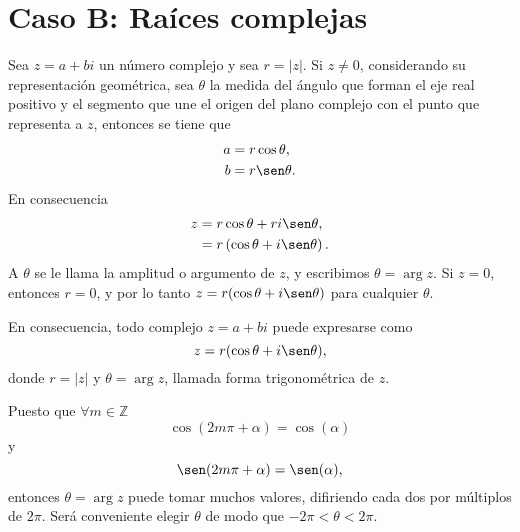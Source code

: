 \section*{Caso B: Raíces complejas}

Sea $z=a+bi$ un número complejo y sea $r=|z|$. Si $z \neq 0$, considerando su representación geométrica, sea $\theta$ la medida del ángulo que forman el eje real positivo y el segmento que une el origen del plano complejo con el punto que representa a $z$, entonces se tiene que
\begin{align*}
    a &=r \cos \theta , \\ 
    b &=r \sen \theta .
\end{align*}
En consecuencia
\begin{align*}
    z & = r \cos \theta + r i \sen \theta , \\ 
    &=r \left( \cos \theta + i \sen \theta \right) .
\end{align*}
A $\theta$ se le llama la amplitud o argumento de $z$, y escribimos $\theta=\arg z$. Si $z=0$, entonces $r=0$, y por lo tanto $z=r(\cos \theta+i \sen \theta)$ para cualquier $\theta$.

En consecuencia, todo complejo $z=a+b i$ puede expresarse como
$$z=r(\cos \theta+i \sen \theta),$$
donde $r=|z|$ y $\theta=\arg z$, llamada forma trigonométrica de $z$.

\begin{center}
\end{center}

Puesto que $\forall m \in \mathbb{Z}$
$$\cos (2m\pi + \alpha ) = \cos (\alpha)$$
y
$$\sen (2m\pi + \alpha) = \sen (\alpha),$$
entonces $\theta = \arg z$ puede tomar muchos valores, difiriendo cada dos por múltiplos de $2\pi$. Será conveniente elegir $\theta$ de modo que $-2\pi < \theta < 2\pi$.

